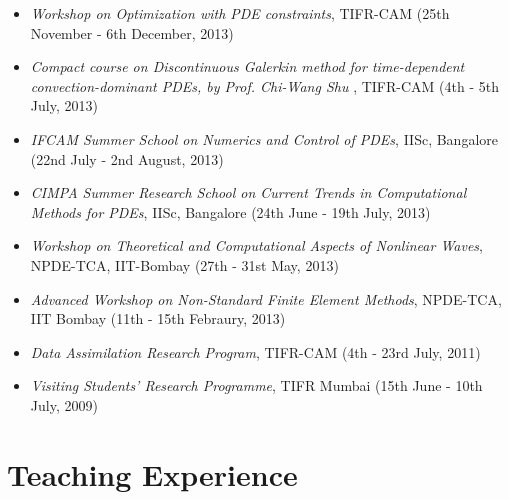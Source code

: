 \documentclass[margin]{res}
\begin{document}
\begin{resume}
\begin{itemize}
              \item{\it Workshop on Optimization with PDE constraints}, TIFR-CAM (25th November - 6th December, 2013)
   
               \item{\it Compact course on Discontinuous Galerkin method for time-dependent convection-dominant PDEs, by Prof. Chi-Wang Shu }, TIFR-CAM (4th - 5th July, 2013)
               
               
               \item{\it IFCAM Summer School on Numerics and Control of PDEs}, IISc, Bangalore (22nd July - 2nd August, 2013)
               
               \item{\it CIMPA Summer Research School on Current Trends in Computational Methods for PDEs}, IISc, Bangalore (24th June - 19th July, 2013)
               
               \item{\it Workshop on Theoretical and Computational Aspects of Nonlinear Waves}, \\NPDE-TCA, IIT-Bombay (27th - 31st May, 2013)

               \item{\it Advanced Workshop on Non-Standard Finite Element Methods}, NPDE-TCA, \\IIT Bombay (11th - 15th Febraury, 2013)

               \item{\it Data Assimilation Research Program}, TIFR-CAM (4th - 23rd July, 2011)

               \item{\it Visiting Students' Research Programme}, TIFR Mumbai (15th June - 10th July, 2009)
               \end{itemize}          
            
              
\section{Teaching Experience} 
   

\end{resume}
\end{document}
